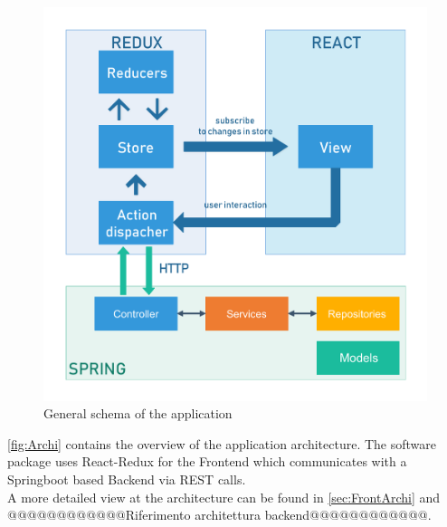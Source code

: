\begin{figure}[H]
\centering
\includegraphics[]{uml/general.pdf} 
\caption{General schema of the application}
\label{fig:Archi}
\end{figure}

\autoref{fig:Archi} contains the overview of the application architecture. The software package uses React-Redux for the Frontend which communicates with a Springboot based Backend via REST calls.\\
A more detailed view at the architecture can be found in \autoref{sec:FrontArchi} and @@@@@@@@@@@@Riferimento architettura backend@@@@@@@@@@@@.